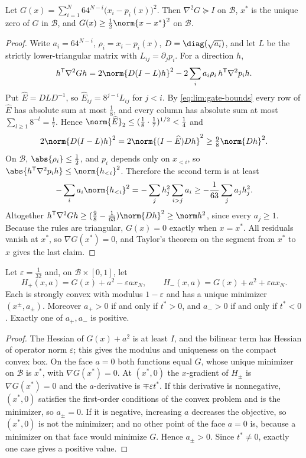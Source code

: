 \begin{lemma}\label{lem:lim:gates}
Let $G(x)=\sum_{i=1}^N64^{N-i}\bigl(x_i-p_i(x)\bigr)^2$. Then
$\nabla^2G\succeq I$ on $\mathcal B$, $x^*$ is the unique zero of $G$ in
$\mathcal B$, and $G(x)\ge\frac12\norm{x-x^*}^2$ on $\mathcal B$.
\end{lemma}

\begin{proof}
Write $a_i=64^{N-i}$, $\rho_i=x_i-p_i(x)$, $D=\diag(\sqrt{a_i})$, and let $L$
be the strictly lower-triangular matrix with $L_{ij}=\partial_jp_i$. For a
direction $h$,
\[
 h^{\mathsf T}\nabla^2Gh=2\norm{D(I-L)h}^2-2\sum_ia_i\rho_i\,h^{\mathsf T}\nabla^2p_ih .
\]
Put $\widehat E=DLD^{-1}$, so $\widehat E_{ij}=8^{j-i}L_{ij}$ for $j<i$. By
\eqref{eq:lim:gate-bounds} every row of $\widehat E$ has absolute sum at
most $\frac18$, and every column has absolute sum at most
$\sum_{l\ge1}8^{-l}=\frac17$. Hence
$\norm{\widehat E}_2\le(\frac18\cdot\frac17)^{1/2}<\frac14$ and
\[
 2\norm{D(I-L)h}^2=2\norm{(I-\widehat E)Dh}^2\ge\tfrac98\norm{Dh}^2 .
\]
On $\mathcal B$, $\abs{\rho_i}\le\frac12$, and $p_i$ depends only on
$x_{<i}$, so $\abs{h^{\mathsf T}\nabla^2p_ih}\le\norm{h_{<i}}^2$. Therefore the
second term is at least
\[
 -\sum_ia_i\norm{h_{<i}}^2=-\sum_jh_j^2\sum_{i>j}a_i\ge-\frac1{63}\sum_ja_jh_j^2 .
\]
Altogether $h^{\mathsf T}\nabla^2Gh\ge(\frac98-\frac1{63})\norm{Dh}^2\ge\norm h^2$,
since every $a_j\ge1$. Because the rules are triangular, $G(x)=0$ exactly
when $x=x^*$. All residuals vanish at $x^*$, so $\nabla G(x^*)=0$, and
Taylor's theorem on the segment from $x^*$ to $x$ gives the last claim.
\end{proof}

\begin{lemma}\label{lem:lim:signs}
Let $\varepsilon=\frac1{32}$ and, on $\mathcal B\times[0,1]$, let
\[
 H_+(x,a)=G(x)+a^2-\varepsilon ax_N,\qquad H_-(x,a)=G(x)+a^2+\varepsilon ax_N .
\]
Each is strongly convex with modulus $1-\varepsilon$ and has a unique
minimizer $(x^\pm,a_\pm)$. Moreover $a_+>0$ if and only if $t^*>0$, and
$a_->0$ if and only if $t^*<0$. Exactly one of $a_+,a_-$ is positive.
\end{lemma}

\begin{proof}
The Hessian of $G(x)+a^2$ is at least $I$, and the bilinear term has Hessian
of operator norm $\varepsilon$; this gives the modulus and uniqueness on the
compact convex box. On the face $a=0$ both functions equal $G$, whose unique
minimizer on $\mathcal B$ is $x^*$, with $\nabla G(x^*)=0$. At $(x^*,0)$ the
$x$-gradient of $H_\pm$ is $\nabla G(x^*)=0$ and the $a$-derivative is
$\mp\varepsilon t^*$. If this derivative is nonnegative, $(x^*,0)$
satisfies the first-order conditions of the convex problem and is the
minimizer, so $a_\pm=0$. If it is negative, increasing $a$ decreases the
objective, so $(x^*,0)$ is not the minimizer; and no other point of the face
$a=0$ is, because a minimizer on that face would minimize $G$. Hence
$a_\pm>0$. Since $t^*\ne0$, exactly one case gives a positive value.
\end{proof}

